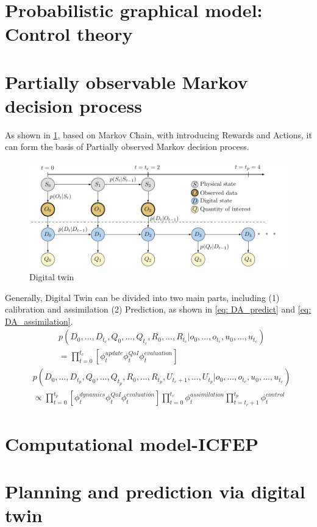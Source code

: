 \section{Probabilistic graphical model: Control theory }




\section{Partially observable Markov decision process}

As shown in \cref{fig: POMDP}, based on Markov Chain, with introducing Rewards and Actions, it can form the basis of Partially observed Markov decision process.
\begin{figure}[H]
    \centering
    \includegraphics[width = 140mm]{Figures/figure-POMDP.pdf}
    \caption{Digital twin}
    \label{fig: POMDP}
\end{figure}
Generally, Digital Twin can be divided into two main parts, including (1) calibration and assimilation (2) Prediction, as shown in \cref{eq: DA_predict}  and \cref{eq: DA_assimilation}.
\begin{equation}
\begin{aligned}
& p(D_{0},...,D_{t_{c}},Q_{0},...,Q_{t_{c}},R_{0},...,R_{t_{c}}|o_{0},...,o_{t_{c}},u_{0},...,u_{t_{c}}) \\
& = \prod_{t=0}^{t_{c}}[\phi_{t}^{update}\phi_{t}^{QoI}\phi_{t}^{evaluation}] \label{eq: DA_predict}
\end{aligned}
\end{equation}
\begin{equation}
\begin{aligned}
    & p(D_{0},...,D_{t_{p}},Q_{0},...,Q_{t_{p}},R_{0},...,R_{t_{p}},U_{t_{c}+1},...,U_{t_{p}}|o_{0},...,o_{t_{c}},u_{0},...,u_{t_{c}}) \\
    & \propto \prod_{t=0}^{t_{p}}[\phi_{t}^{dynamics}\phi_{t}^{QoI}\phi_{t}^{evaluation}] \prod_{t=0}^{t_{c}}\phi_{t}^{assimilation} \prod_{t=t_{c}+1}^{t_{p}}\phi_{t}^{control} \label{eq: DA_assimilation}
\end{aligned}
\end{equation}
\section{Computational model-ICFEP}

\section{Planning and prediction via digital twin}